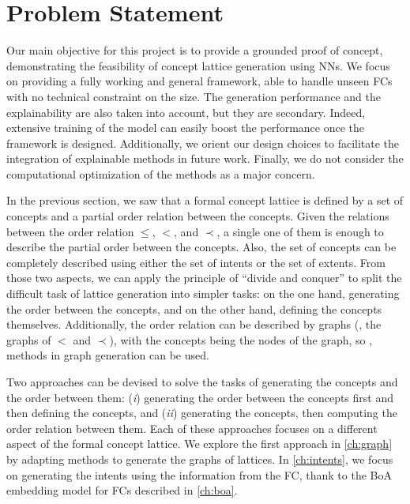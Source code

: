 \section{Problem Statement\label{sec:problem}}
Our main objective for this project is to provide a grounded proof of concept, demonstrating the feasibility of concept lattice generation using NNs.
We focus on providing a fully working and general framework, able to handle unseen FCs with no technical constraint on the size.
The generation performance and the explainability are also taken into account, but they are secondary. Indeed, extensive training of the model can easily boost the performance once the framework is designed. Additionally, we orient our design choices to facilitate the integration of explainable methods in future work.
Finally, we do not consider the computational optimization of the methods as a major concern.

In the previous section, we saw that a formal concept lattice is defined by a set of concepts and a partial order relation between the concepts.
Given the relations between the order relation $\leq$, $<$, and $\prec$, a single one of them is enough to describe the partial order between the concepts.
Also, the set of concepts can be completely described using either the set of intents or the set of extents.
%
From those two aspects, we can apply the principle of ``divide and conquer'' to split the difficult task of lattice generation into simpler tasks:
on the one hand, generating the order between the concepts, and on the other hand, defining the concepts themselves.
Additionally, the order relation can be described by graphs (\eg, the graphs of $<$ and $\prec$), with the concepts being the nodes of the graph, so \soa{}, methods in graph generation can be used.

Two approaches can be devised to solve the tasks of generating the concepts and the order between them: (\textit{i}) generating the order between the concepts first and then defining the concepts, and (\textit{ii}) generating the concepts, then computing the order relation between them. Each of these approaches focuses on a different aspect of the formal concept lattice.
We explore the first approach in \cref{ch:graph} by adapting \soa{} methods to generate the graphs of lattices.
In \cref{ch:intents}, we focus on generating the intents using the information from the FC, thank to the BoA embedding model for FCs described in \cref{ch:boa}.

